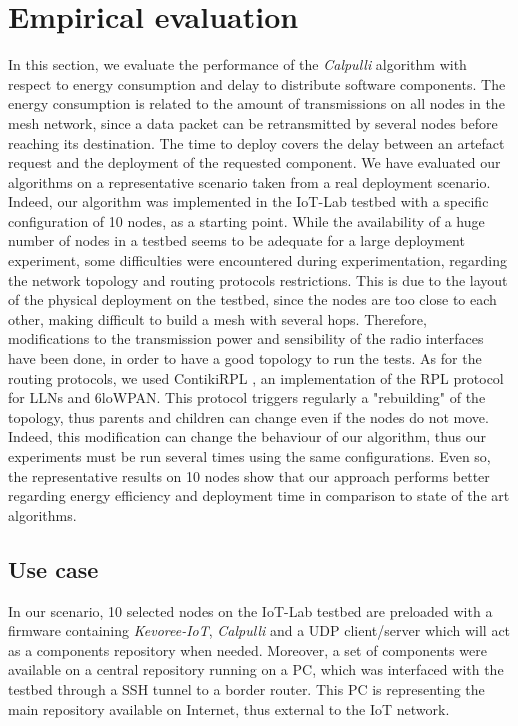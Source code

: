\section{Empirical evaluation}
In this section, we evaluate the performance of the \textit{Calpulli} algorithm with respect to energy consumption and delay to distribute software components.
The energy consumption is related to the amount of transmissions on all nodes in the mesh network, since a data packet can be retransmitted by several nodes before reaching its destination.
The time to deploy covers the delay between an artefact request and the deployment of the requested component.
We have evaluated our algorithms on a representative scenario taken from a real deployment scenario.
Indeed, our algorithm was implemented in the IoT-Lab testbed  \cite{Fleury15iotlab} with a specific configuration of 10 nodes, as a starting point.
While the availability of a huge number of nodes in a testbed seems to be adequate for a large deployment experiment, some difficulties were encountered during experimentation, regarding the network topology and routing protocols restrictions.
This is due to the layout of the physical deployment on the testbed, since the nodes are too close to each other, making difficult to build a mesh with several hops.
Therefore, modifications to the transmission power and sensibility of the radio interfaces have been done, in order to have a good topology to run the tests.
As for the routing protocols, we used ContikiRPL \cite{tsiftes2010contikirpl}, an implementation of the RPL \cite{rfc6550} protocol for LLNs and 6loWPAN.
This protocol triggers regularly a "rebuilding" of the topology, thus parents and children can change even if the nodes do not move.
Indeed, this modification can change the behaviour of our algorithm, thus our experiments must be run several times using the same configurations.
Even so, the representative results on 10 nodes show that our approach performs better regarding energy efficiency and deployment time in comparison to state of the art algorithms.

\subsection{Use case}
In our scenario, 10 selected nodes on the IoT-Lab testbed are preloaded with a firmware containing \textit{Kevoree-IoT}, \textit{Calpulli} and a UDP client/server which will act as a components repository when needed.
Moreover, a set of components were available on a central repository running on a PC, which was interfaced with the testbed through a SSH tunnel to a border router. This PC is representing the main repository available on Internet, thus external to the IoT network.

